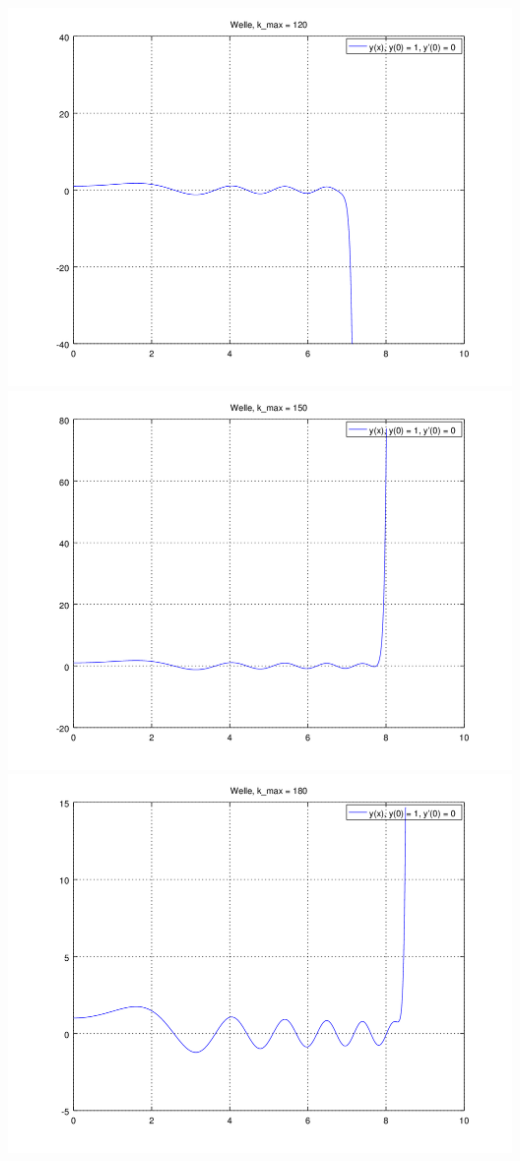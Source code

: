 \begin{refsection}
\includegraphics[scale=0.35]{./wellen/octave/images/kmax/ak120wave.png}
\includegraphics[scale=0.35]{./wellen/octave/images/kmax/ak150wave.png}
\includegraphics[scale=0.35]{./wellen/octave/images/kmax/ak180wave.png}

\end{refsection}
